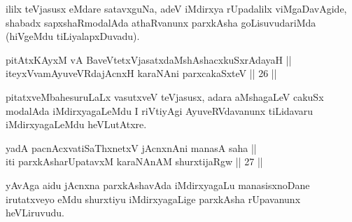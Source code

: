 \begin{artha}
ililx teVjasusx eMdare satavxguNa, adeV iMdirxya
rUpadalilx viMgaDavAgide, shabadx sapxshaRmodalAda athaRvanunx
parxkAsha goLisuvudariMda (hiVgeMdu tiLiyalapxDuvadu).
\end{artha}

\begin{shl}
\footnotemark[1]pitAtxKAyxM vA BaveVtetxVjasatxdaMshAshacxkuSxrAdayaH ||  \\
iteyxVvamAyuveVRdajAcnxH karaNAni parxcakaSxteV \hfill || 26 ||

\end{shl}

\begin{artha}
pitatxveMbahesuruLaLx vasutxveV teVjasusx, adara aMshagaLeV cakuSx
modalAda iMdirxyagaLeMdu I riVtiyAgi AyuveRVdavanunx tiLidavaru
iMdirxyagaLeMdu heVLutAtxre.
\end{artha}


\begin{shl}
yadA pacnAcxvatiSaThxnetxV jAcnxnAni manasA saha || \\
iti parxkAsharUpatavxM karaNAnAM shurxtijaRgw \hfill || 27 ||
  
\end{shl}

\begin{artha}
yAvAga aidu jAcnxna parxkAshavAda iMdirxyagaLu manasisxnoDane
irutatxveyo eMdu shurxtiyu iMdirxyagaLige parxkAsha rUpavanunx
heVLiruvudu.
\end{artha}


